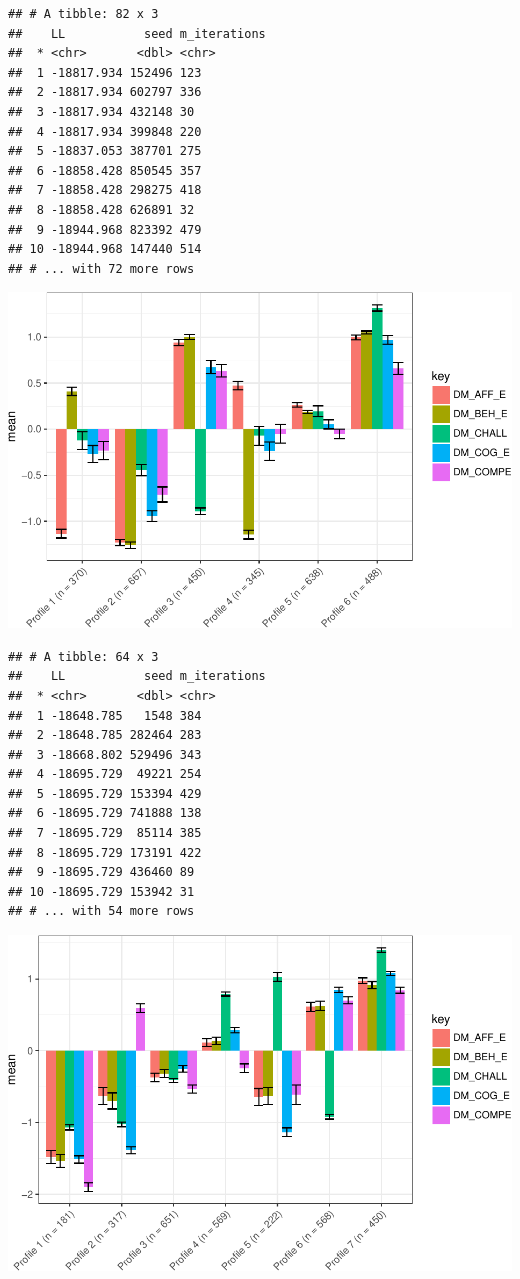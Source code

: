 \documentclass[]{book}
\theoremstyle{definition}
\theoremstyle{definition}
\theoremstyle{definition}
\theoremstyle{remark}
\begin{document}
\begin{verbatim}
## # A tibble: 82 x 3
##    LL           seed m_iterations
##  * <chr>       <dbl> <chr>       
##  1 -18817.934 152496 123         
##  2 -18817.934 602797 336         
##  3 -18817.934 432148 30          
##  4 -18817.934 399848 220         
##  5 -18837.053 387701 275         
##  6 -18858.428 850545 357         
##  7 -18858.428 298275 418         
##  8 -18858.428 626891 32          
##  9 -18944.968 823392 479         
## 10 -18944.968 147440 514         
## # ... with 72 more rows
\end{verbatim}

\includegraphics{rosenberg-dissertation_files/figure-latex/spec-solutions-model1-4.pdf}

\begin{verbatim}
## # A tibble: 64 x 3
##    LL           seed m_iterations
##  * <chr>       <dbl> <chr>       
##  1 -18648.785   1548 384         
##  2 -18648.785 282464 283         
##  3 -18668.802 529496 343         
##  4 -18695.729  49221 254         
##  5 -18695.729 153394 429         
##  6 -18695.729 741888 138         
##  7 -18695.729  85114 385         
##  8 -18695.729 173191 422         
##  9 -18695.729 436460 89          
## 10 -18695.729 153942 31          
## # ... with 54 more rows
\end{verbatim}

\includegraphics{rosenberg-dissertation_files/figure-latex/spec-solutions-model1-5.pdf}
\end{document}
